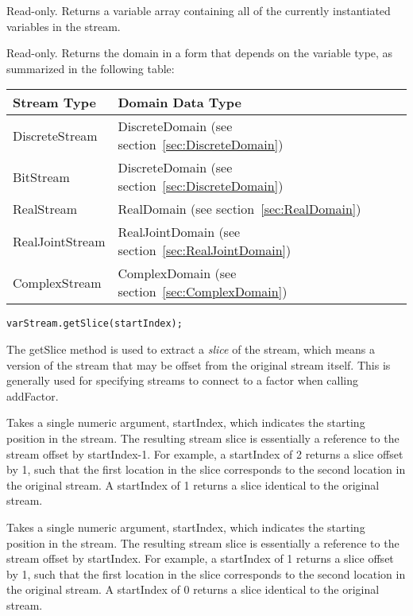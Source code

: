 
Read-only.  Returns a variable array containing all of the currently instantiated variables in the stream.


Read-only.  Returns the domain in a form that depends on the variable type, as summarized in the following table:

\begin{longtable} {l | p{7cm}}
Stream Type & Domain Data Type \\
\hline
\endhead
DiscreteStream & DiscreteDomain (see section~\ref{sec:DiscreteDomain}) \\
BitStream & DiscreteDomain (see section~\ref{sec:DiscreteDomain}) \\
RealStream & RealDomain (see section~\ref{sec:RealDomain}) \\
RealJointStream & RealJointDomain (see section~\ref{sec:RealJointDomain}) \\ 
ComplexStream & ComplexDomain (see section~\ref{sec:ComplexDomain}) \\
\end{longtable} 



\label{sec:VariableStream.getSlice}

\begin{lstlisting}
varStream.getSlice(startIndex);
\end{lstlisting}

The getSlice method is used to extract a \emph{slice} of the stream, which means a version of the stream that may be offset from the original stream itself.  This is generally used for specifying streams to connect to a factor when calling addFactor.

\ifmatlab
Takes a single numeric argument, startIndex, which indicates the starting position in the stream.  The resulting stream slice is essentially a reference to the stream offset by startIndex-1.  For example, a startIndex of 2 returns a slice offset by 1, such that the first location in the slice corresponds to the second location in the original stream.  A startIndex of 1 returns a slice identical to the original stream.
\fi

\ifjava
Takes a single numeric argument, startIndex, which indicates the starting position in the stream.  The resulting stream slice is essentially a reference to the stream offset by startIndex.  For example, a startIndex of 1 returns a slice offset by 1, such that the first location in the slice corresponds to the second location in the original stream.  A startIndex of 0 returns a slice identical to the original stream.
\fi

